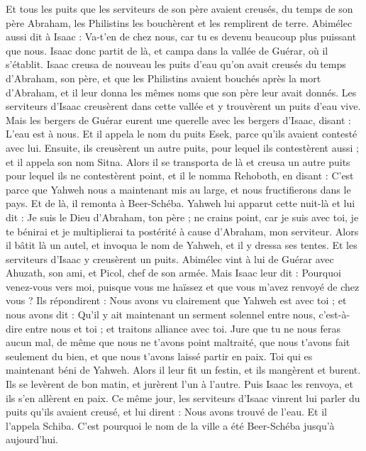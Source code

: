 \begin{multicols}{2}
Et tous les puits que les serviteurs de son père avaient creusés, du temps de son père Abraham, les Philistins les bouchèrent et les remplirent de terre.
Abimélec aussi dit à Isaac : Va-t'en de chez nous, car tu es devenu beaucoup plus puissant que nous.
Isaac donc partit de là, et campa dans la vallée de Guérar, où il s'établit.
Isaac creusa de nouveau les puits d'eau qu'on avait creusés du temps d'Abraham, son père, et que les Philistins avaient bouchés après la mort d'Abraham, et il leur donna les mêmes noms que son père leur avait donnés.
Les serviteurs d'Isaac creusèrent dans cette vallée et y trouvèrent un puits d'eau vive.
Mais les bergers de Guérar eurent une querelle avec les bergers d'Isaac, disant : L'eau est à nous. Et il appela le nom du puits Esek, parce qu'ils avaient contesté avec lui.
Ensuite, ils creusèrent un autre puits, pour lequel ils contestèrent aussi ; et il appela son nom Sitna.
Alors il se transporta de là et creusa un autre puits pour lequel ils ne contestèrent point, et il le nomma Rehoboth, en disant : C'est parce que Yahweh nous a maintenant mis au large, et nous fructifierons dans le pays.
Et de là, il remonta à Beer-Schéba.
Yahweh lui apparut cette nuit-là et lui dit : Je suis le Dieu d'Abraham, ton père ; ne crains point, car je suis avec toi, je te bénirai et je multiplierai ta postérité à cause d'Abraham, mon serviteur.
Alors il bâtit là un autel, et invoqua le nom de Yahweh, et il y dressa ses tentes. Et les serviteurs d'Isaac y creusèrent un puits.
Abimélec vint à lui de Guérar avec Ahuzath, son ami, et Picol, chef de son armée.
Mais Isaac leur dit : Pourquoi venez-vous vers moi, puisque vous me haïssez et que vous m'avez renvoyé de chez vous ?
Ils répondirent : Nous avons vu clairement que Yahweh est avec toi ; et nous avons dit : Qu'il y ait maintenant un serment solennel entre nous, c'est-à-dire entre nous et toi ; et traitons alliance avec toi.
Jure que tu ne nous feras aucun mal, de même que nous ne t'avons point maltraité, que nous t'avons fait seulement du bien, et que nous t'avons laissé partir en paix. Toi qui es maintenant béni de Yahweh.
Alors il leur fit un festin, et ils mangèrent et burent.
Ils se levèrent de bon matin, et jurèrent l'un à l'autre. Puis Isaac les renvoya, et ils s'en allèrent en paix.
Ce même jour, les serviteurs d'Isaac vinrent lui parler du puits qu'ils avaient creusé, et lui dirent : Nous avons trouvé de l'eau.
Et il l'appela Schiba. C'est pourquoi le nom de la ville a été Beer-Schéba jusqu'à aujourd'hui.

\end{multicols}
